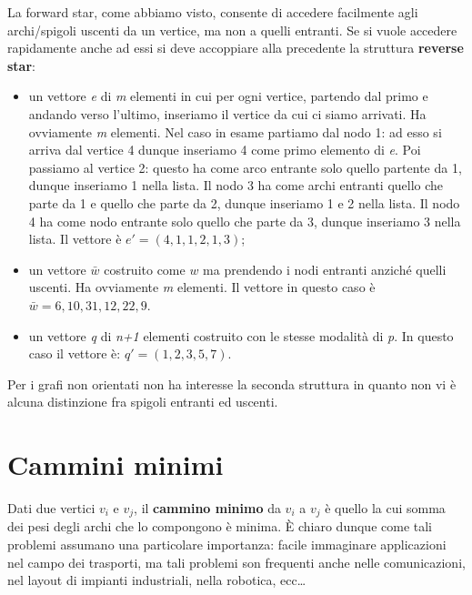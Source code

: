 \documentclass[11pt]{book}
\begin{document}
\begin{itemize}
\end{itemize}

La forward star, come abbiamo visto, consente di accedere facilmente
agli archi/spigoli uscenti da un vertice, ma non a quelli entranti. Se
si vuole accedere rapidamente anche ad essi si deve accoppiare alla
precedente la struttura {\bf reverse star}:

\begin{itemize}

\item un vettore {\em e} di {\em m} elementi in cui per ogni vertice,
  partendo dal primo e andando verso l'ultimo, inseriamo il vertice da
  cui ci siamo arrivati. Ha ovviamente {\em m} elementi. Nel caso in
  esame partiamo dal nodo 1: ad esso si arriva dal vertice 4 dunque
  inseriamo 4 come primo elemento di {\em e}. Poi passiamo al vertice
  2: questo ha come arco entrante solo quello partente da 1, dunque
  inseriamo 1 nella lista. Il nodo 3 ha come archi entranti quello che
  parte da 1 e quello che parte da 2, dunque inseriamo 1 e 2 nella
  lista. Il nodo 4 ha come nodo entrante solo quello che parte da 3,
  dunque inseriamo 3 nella lista. Il vettore \`e $e' = (4,1,1,2,1,3)$;
  
\item un vettore $\bar{w}$ costruito come $w$ ma prendendo i nodi
  entranti anzich\'e quelli uscenti. Ha ovviamente {\em m}
  elementi. Il vettore in questo caso \`e $\bar{w} = 6, 10, 31, 12,
  22, 9$. 

\item un vettore {\em q} di {\em n+1} elementi costruito con le stesse
  modalit\`a di {\em p}. In questo caso il vettore \`e: $q' = (1, 2,
  3, 5, 7)$.

\end{itemize}

Per i grafi non orientati non ha interesse la seconda struttura in
quanto non vi \`e alcuna distinzione fra spigoli entranti ed uscenti.


\section{Cammini minimi}


Dati due vertici $v_i$ e $v_j$, il {\bf cammino minimo} da $v_i$ a
$v_j$ \`e quello la cui somma dei pesi degli archi che lo compongono
\`e minima. \`E chiaro dunque come tali problemi assumano una
particolare importanza: facile immaginare applicazioni nel campo dei
trasporti, ma tali problemi son frequenti anche nelle comunicazioni,
nel layout di impianti industriali, nella robotica, ecc\dots
\end{document}

